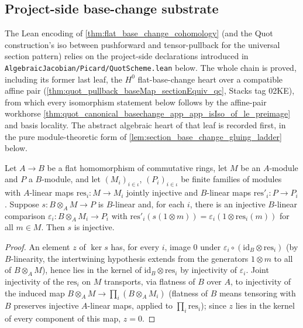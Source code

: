 \subsection{Project-side base-change substrate}
\label{subsec:quot_project_basechange}

The Lean encoding of \cref{thm:flat_base_change_cohomology} (and the
Quot construction's iso between pushforward and tensor-pullback for the
universal section pattern) relies on the project-side declarations
introduced in \texttt{AlgebraicJacobian/Picard/QuotScheme.lean} below.
The whole chain is proved, including its former last leaf, the \(H^0\)
flat-base-change heart over a compatible affine pair
(\cref{thm:quot_pullback_baseMap_sectionEquiv_qc}, Stacks tag 02KE), from
which every isomorphism statement below follows by the affine-pair
workhorse \cref{thm:quot_canonical_basechange_app_app_isIso_of_le_preimage}
and basis locality. The abstract algebraic heart of that leaf is recorded
first, in the pure module-theoretic form of
\cref{lem:section_base_change_gluing_ladder} below.

\begin{lemma}
  \label{lem:section_base_change_injective_cover}
  \leanok
  Let \(A \to B\) be a flat homomorphism of commutative rings, let \(M\) be
  an \(A\)-module and \(P\) a \(B\)-module, and let \((M_i)_{i \in \iota}\),
  \((P_i)_{i \in \iota}\) be finite families of modules with \(A\)-linear
  maps \(\mathrm{res}_i : M \to M_i\) jointly injective and \(B\)-linear
  maps \(\mathrm{res}'_i : P \to P_i\). Suppose \(s : B \otimes_A M \to P\)
  is \(B\)-linear and, for each \(i\), there is an injective \(B\)-linear
  comparison \(\varepsilon_i : B \otimes_A M_i \to P_i\) with
  \(\mathrm{res}'_i(s(1 \otimes m)) = \varepsilon_i(1 \otimes
  \mathrm{res}_i(m))\) for all \(m \in M\). Then \(s\) is injective.
\end{lemma}
\begin{proof}\leanok
  An element \(z\) of \(\ker s\) has, for every \(i\), image \(0\) under
  \(\varepsilon_i \circ (\mathrm{id}_B \otimes \mathrm{res}_i)\) (by
  \(B\)-linearity, the intertwining hypothesis extends from the generators
  \(1 \otimes m\) to all of \(B \otimes_A M\)), hence lies in the kernel of
  \(\mathrm{id}_B \otimes \mathrm{res}_i\) by injectivity of \(\varepsilon_i\).
  Joint injectivity of the \(\mathrm{res}_i\) on \(M\) transports, via
  flatness of \(B\) over \(A\), to injectivity of the induced map
  \(B \otimes_A M \to \prod_i (B \otimes_A M_i)\) (flatness of \(B\) means
  tensoring with \(B\) preserves injective \(A\)-linear maps, applied to
  \(\prod_i \mathrm{res}_i\)); since \(z\) lies in the kernel of every
  component of this map, \(z = 0\).
\end{proof}

